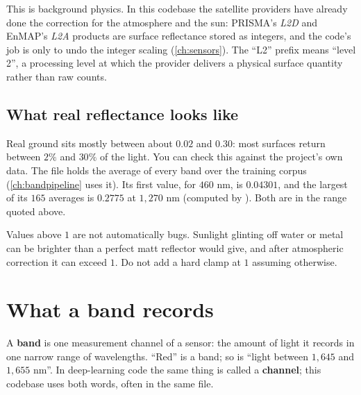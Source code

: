 This is background physics. In this codebase the satellite providers have already done the
correction for the atmosphere and the sun: PRISMA's \emph{L2D} and EnMAP's \emph{L2A} products
are surface reflectance stored as integers, and the code's job is only to undo the integer
scaling (\cref{ch:sensors}). The ``L2'' prefix means ``level 2'', a processing level at which the
provider delivers a physical surface quantity rather than raw counts.

\subsection{What real reflectance looks like}

Real ground sits mostly between about $0.02$ and $0.30$: most surfaces return between $2\%$ and
$30\%$ of the light. You can check this against the project's own data. The file
 holds the average of every band over the training corpus
(\cref{ch:bandpipeline} uses it). Its first value, for $460$ nm, is
$0.04301$, and the largest of its $165$ averages is $0.2775$
at $1{,}270$ nm\tagC{} (computed by ). Both are in
the range quoted above.

Values above $1$ are not automatically bugs. Sunlight glinting off water or metal can be brighter
than a perfect matt reflector would give, and after atmospheric correction it can exceed $1$.
Do not add a hard clamp at $1$ assuming otherwise.

\section{What a band records}\label{sec:light:band}

\begin{definition}[Band]
A \textbf{band} is one measurement channel of a sensor: the amount of light it records in one
narrow range of wavelengths. ``Red'' is a band; so is ``light between $1{,}645$ and $1{,}655$ nm''.
In deep-learning code the same thing is called a \textbf{channel}; this codebase
uses both words, often in the same file.
\end{definition}

